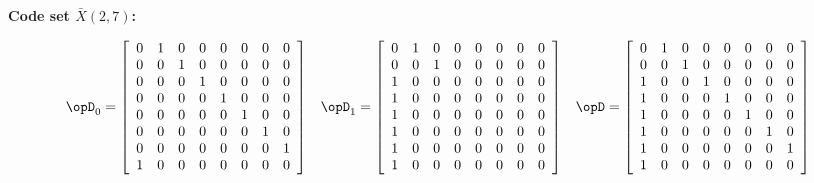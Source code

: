 \begin{example}{\bf Code set $\bar{X}(2,7)$:}
\begin{fsK}
\[
   \opD_0 = 
      \left[
         \begin{array}{*{8}{c}}
            0 & 1 & 0 & 0 & 0 & 0 & 0 & 0  \\
            0 & 0 & 1 & 0 & 0 & 0 & 0 & 0  \\
            0 & 0 & 0 & 1 & 0 & 0 & 0 & 0  \\
            0 & 0 & 0 & 0 & 1 & 0 & 0 & 0  \\
            0 & 0 & 0 & 0 & 0 & 1 & 0 & 0  \\
            0 & 0 & 0 & 0 & 0 & 0 & 1 & 0  \\
            0 & 0 & 0 & 0 & 0 & 0 & 0 & 1  \\
            1 & 0 & 0 & 0 & 0 & 0 & 0 & 0  
         \end{array}
      \right]
\hspace{2ex}
   \opD_1 = 
      \left[
         \begin{array}{*{8}{c}}
            0 & 1 & 0 & 0 & 0 & 0 & 0 & 0  \\
            0 & 0 & 1 & 0 & 0 & 0 & 0 & 0  \\
            1 & 0 & 0 & 0 & 0 & 0 & 0 & 0  \\
            1 & 0 & 0 & 0 & 0 & 0 & 0 & 0  \\
            1 & 0 & 0 & 0 & 0 & 0 & 0 & 0  \\
            1 & 0 & 0 & 0 & 0 & 0 & 0 & 0  \\
            1 & 0 & 0 & 0 & 0 & 0 & 0 & 0  \\
            1 & 0 & 0 & 0 & 0 & 0 & 0 & 0  
         \end{array}
      \right]
\hspace{2ex}
   \opD   = 
      \left[
         \begin{array}{*{8}{c}}
            0 & 1 & 0 & 0 & 0 & 0 & 0 & 0  \\
            0 & 0 & 1 & 0 & 0 & 0 & 0 & 0  \\
            1 & 0 & 0 & 1 & 0 & 0 & 0 & 0  \\
            1 & 0 & 0 & 0 & 1 & 0 & 0 & 0  \\
            1 & 0 & 0 & 0 & 0 & 1 & 0 & 0  \\
            1 & 0 & 0 & 0 & 0 & 0 & 1 & 0  \\
            1 & 0 & 0 & 0 & 0 & 0 & 0 & 1  \\
            1 & 0 & 0 & 0 & 0 & 0 & 0 & 0  
         \end{array}
      \right]
\]
\end{fsK}


\end{example}
